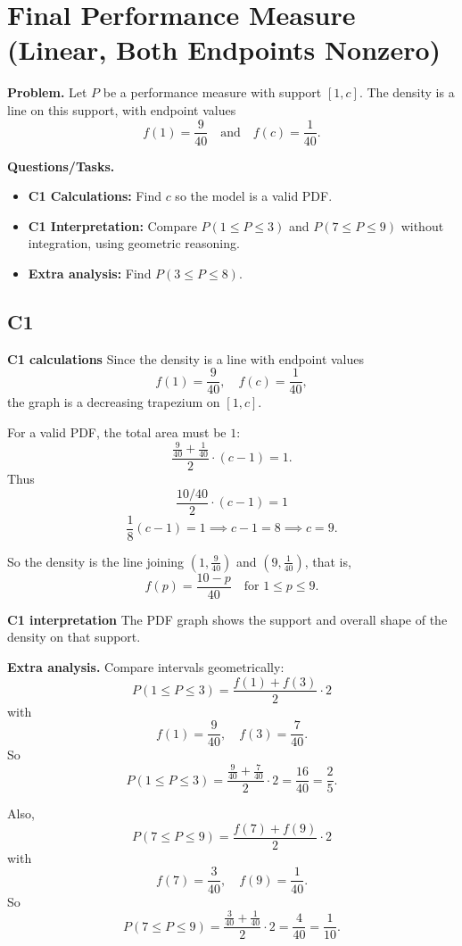 	\section{Final Performance Measure (Linear, Both Endpoints Nonzero)}
	
	\textbf{Problem.}
	Let $P$ be a performance measure with support $[1,c]$. The density is a line on this support, with endpoint values
	\[
	f(1)=\frac{9}{40}
	\quad\text{and}\quad
	f(c)=\frac{1}{40}.
	\]
	
	\textbf{Questions/Tasks.}
	\begin{itemize}
		\item \textbf{C1 Calculations:} Find $c$ so the model is a valid PDF.
		\item \textbf{C1 Interpretation:} Compare $P(1\le P\le 3)$ and $P(7\le P\le 9)$ without integration, using geometric reasoning.
		\item \textbf{Extra analysis:} Find $P(3\le P\le 8)$.
	\end{itemize}
	
	\subsection*{C1}
	
	\textbf{C1 calculations}
	Since the density is a line with endpoint values
	\[
	f(1)=\frac{9}{40},\quad f(c)=\frac{1}{40},
	\]
	the graph is a decreasing trapezium on $[1,c]$.
	
	For a valid PDF, the total area must be $1$:
	\[
	\frac{\frac{9}{40}+\frac{1}{40}}{2}\cdot(c-1)=1.
	\]
	Thus
	\[
	\frac{10/40}{2}\cdot(c-1)=1
	\]
	\[
	\frac18(c-1)=1\implies c-1=8\implies c=9.
	\]
	
	So the density is the line joining $(1,\frac{9}{40})$ and $(9,\frac{1}{40})$, that is,
	\[
	f(p)=\frac{10-p}{40}\quad\text{for }1\le p\le 9.
	\]
	
	\textbf{C1 interpretation}
	The PDF graph shows the support and overall shape of the density on that support.
	
	\textbf{Extra analysis.}
	Compare intervals geometrically:
	\[
	P(1\le P\le3)=\frac{f(1)+f(3)}{2}\cdot2
	\]
	with
	\[
	f(1)=\frac{9}{40},\quad f(3)=\frac{7}{40}.
	\]
	So
	\[
	P(1\le P\le3)=\frac{\frac{9}{40}+\frac{7}{40}}{2}\cdot2=\frac{16}{40}=\frac25.
	\]
	
	Also,
	\[
	P(7\le P\le9)=\frac{f(7)+f(9)}{2}\cdot2
	\]
	with
	\[
	f(7)=\frac{3}{40},\quad f(9)=\frac{1}{40}.
	\]
	So
	\[
	P(7\le P\le9)=\frac{\frac{3}{40}+\frac{1}{40}}{2}\cdot2=\frac{4}{40}=\frac1{10}.
	\]
	
